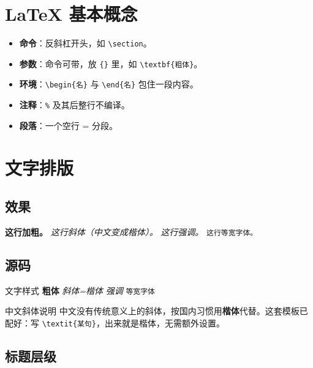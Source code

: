 \section{LaTeX 基本概念}

\begin{itemize}
  \item \textbf{命令}：反斜杠开头，如 \texttt{\textbackslash section}。
  \item \textbf{参数}：命令可带，放 \texttt{\{\}} 里，如 \texttt{\textbackslash textbf\{粗体\}}。
  \item \textbf{环境}：\texttt{\textbackslash begin\{名\}} 与 \texttt{\textbackslash end\{名\}} 包住一段内容。
  \item \textbf{注释}：\texttt{\%} 及其后整行不编译。
  \item \textbf{段落}：一个空行 = 分段。
\end{itemize}

\section{文字排版}

\subsection{效果}

\textbf{这行加粗。}  \textit{这行斜体（中文变成楷体）。}  \emph{这行强调。}  \texttt{这行等宽字体。}

\subsection{源码}

\begin{codebox}[latex]{文字样式}
\textbf{粗体}          %
\textit{斜体=楷体}     %
\emph{强调}            %
\texttt{等宽字体}      %
\end{codebox}

\begin{notebox}[tl]{中文斜体说明}
中文没有传统意义上的斜体，按国内习惯用\textbf{楷体}代替。这套模板已配好：写 \texttt{\textbackslash textit\{某句\}}，出来就是楷体，无需额外设置。
\end{notebox}

\subsection{标题层级}

